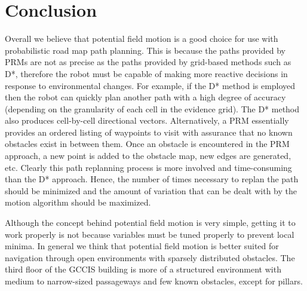 \documentclass[11pt]{article}
\begin{document}
\section{Conclusion}

Overall we believe that potential field motion is a good choice for use with probabilistic road map path planning. This is because the paths provided by PRMs are not as precise as the paths provided by grid-based methods such as D*, therefore the robot must be capable of making more reactive decisions in response to environmental changes. For example, if the D* method is employed then the robot can quickly plan another path with a high degree of accuracy (depending on the granularity of each cell in the evidence grid). The D* method also produces cell-by-cell directional vectors. Alternatively, a PRM essentially provides an ordered listing of waypoints to visit with assurance that no known obstacles exist in between them. Once an obstacle is encountered in the PRM approach, a new point is added to the obstacle map, new edges are generated, etc. Clearly this path replanning process is more involved and time-consuming than the D* approach. Hence, the number of times necessary to replan the path should be minimized and the amount of variation that can be dealt with by the motion algorithm should be maximized.

Although the concept behind potential field motion is very simple, getting it to work properly is not because variables must be tuned properly to prevent local minima. In general we think that potential field motion is better suited for navigation through open environments with sparsely distributed obstacles. The third floor of the GCCIS building is more of a structured environment with medium to narrow-sized passageways and few known obstacles, except for pillars. 
\end{document}
